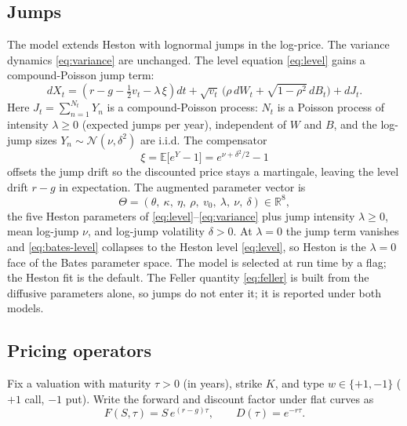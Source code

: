 \documentclass[a4paper, 11pt, reqno]{amsart}
\newcommand{\Real}{\mathbb{R}}
\begin{document}
		\subsection{Jumps}\label{sec:jumps}
			The \textcite{bates1996} model extends Heston with \textcite{merton1976} lognormal jumps in the
			log-price. The variance dynamics \eqref{eq:variance} are unchanged. The level equation
			\eqref{eq:level} gains a compound-Poisson jump term:
			\begin{equation}\label{eq:bates-level}
				dX_t = \left( r - g - \tfrac{1}{2} v_t - \lambda\,\xi \right) dt
				       + \sqrt{v_t}\,\bigl( \rho\, dW_t + \sqrt{1 - \rho^2}\, dB_t \bigr) + dJ_t .
			\end{equation}
			Here $J_t = \sum_{n=1}^{N_t} Y_n$ is a compound-Poisson process: $N_t$ is a Poisson process
			of intensity $\lambda\ge 0$ (expected jumps per year), independent of $W$ and $B$, and the
			log-jump sizes $Y_n \sim \mathcal{N}(\nu,\delta^2)$ are i.i.d. The compensator
			\begin{equation}\label{eq:bates-compensator}
				\xi = \mathbb{E}\bigl[ e^{Y} - 1 \bigr] = e^{\nu + \delta^2/2} - 1
			\end{equation}
			offsets the jump drift so the discounted price stays a martingale, leaving the level drift
			$r-g$ in expectation. The augmented parameter vector is
			\begin{equation}\label{eq:bates-params}
				\Theta = (\theta,\ \kappa,\ \eta,\ \rho,\ v_0,\ \lambda,\ \nu,\ \delta) \in \Real^8,
			\end{equation}
			the five Heston parameters of \eqref{eq:level}--\eqref{eq:variance} plus jump intensity
			$\lambda\ge 0$, mean log-jump $\nu$, and log-jump volatility $\delta>0$. At $\lambda=0$ the
			jump term vanishes and \eqref{eq:bates-level} collapses to the Heston level \eqref{eq:level},
			so Heston is the $\lambda=0$ face of the Bates parameter space. The model is selected at run
			time by a flag; the Heston fit is the default. The Feller quantity \eqref{eq:feller} is built
			from the diffusive parameters alone, so jumps do not enter it; it is reported under both models.
			
		\subsection{Pricing operators}\label{sec:pricing}
			Fix a valuation with maturity $\tau>0$ (in years), strike $K$, and type
			$w\in\{+1,-1\}$ ($+1$ call, $-1$ put). Write the forward and discount factor under flat
			curves as
			\begin{equation}\label{eq:forward}
				F(S,\tau) = S\, e^{(r-g)\tau}, \qquad D(\tau) = e^{-r\tau}.
			\end{equation}
			
\end{document}
